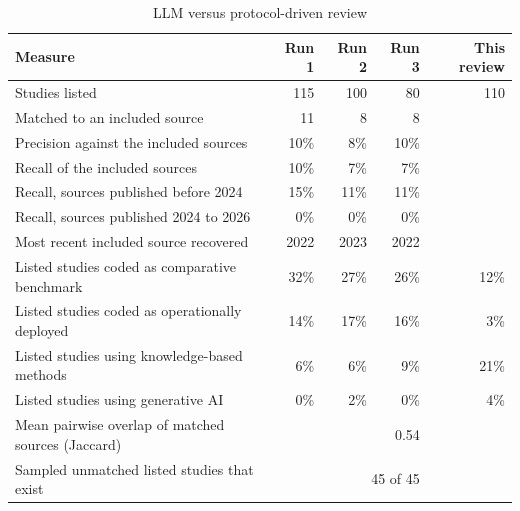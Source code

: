 \begin{table}[htbp!]
\centering
\footnotesize
\caption{LLM versus protocol-driven review}
\label{tab:llm_armA}
\begin{tabular}{@{}lrrrr@{}}
\toprule
Measure & \textbf{Run 1} & \textbf{Run 2} & \textbf{Run 3} & \textbf{This review} \\
\midrule
Studies listed & 115 & 100 & 80 & 110 \\
Matched to an included source & 11 & 8 & 8 &  \\
Precision against the included sources & 10\% & 8\% & 10\% &  \\
Recall of the included sources & 10\% & 7\% & 7\% &  \\
Recall, sources published before 2024 & 15\% & 11\% & 11\% &  \\
Recall, sources published 2024 to 2026 & 0\% & 0\% & 0\% &  \\
Most recent included source recovered & 2022 & 2023 & 2022 &  \\
Listed studies coded as comparative benchmark & 32\% & 27\% & 26\% & 12\% \\
Listed studies coded as operationally deployed & 14\% & 17\% & 16\% & 3\% \\
Listed studies using knowledge-based methods & 6\% & 6\% & 9\% & 21\% \\
Listed studies using generative AI & 0\% & 2\% & 0\% & 4\% \\
\midrule
Mean pairwise overlap of matched sources (Jaccard) & \multicolumn{3}{r}{0.54} & \\
Sampled unmatched listed studies that exist & \multicolumn{3}{r}{45 of 45} & \\
\bottomrule
\end{tabular}
\end{table}
